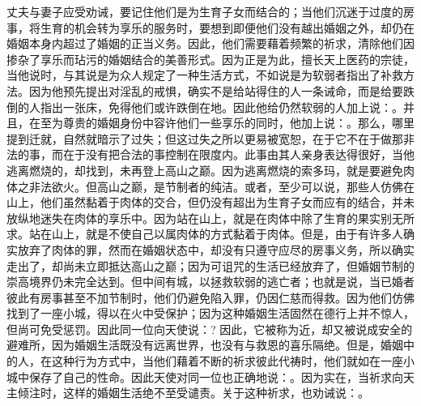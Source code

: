 丈夫与妻子应受劝诫，要记住他们是为生育子女而结合的；当他们沉迷于过度的房事，将生育的机会转为享乐的服务时，要想到即便他们没有越出婚姻之外，却仍在婚姻本身内超过了婚姻的正当义务。因此，他们需要藉着频繁的祈求，清除他们因掺杂了享乐而玷污的婚姻结合的美善形式。因为正是为此，擅长天上医药的宗徒，当他说时，与其说是为众人规定了一种生活方式，不如说是为软弱者指出了补救方法。因为他预先提出对淫乱的戒惧，确实不是给站得住的人一条诫命，而是给要跌倒的人指出一张床，免得他们或许跌倒在地。因此他给仍然软弱的人加上说：。并且，在至为尊贵的婚姻身份中容许他们一些享乐的同时，他加上说：。那么，哪里提到迁就，自然就暗示了过失；但这过失之所以更易被宽恕，在于它不在于做那非法的事，而在于没有把合法的事控制在限度内。此事由其人亲身表达得很好，当他逃离燃烧的，却找到，未再登上高山之巅。因为逃离燃烧的索多玛，就是要避免肉体之非法欲火。但高山之巅，是节制者的纯洁。或者，至少可以说，那些人仿佛在山上，他们虽然黏着于肉体的交合，但仍没有超出为生育子女而应有的结合，并未放纵地迷失在肉体的享乐中。因为站在山上，就是在肉体中除了生育的果实别无所求。站在山上，就是不使自己以属肉体的方式黏着于肉体。但是，由于有许多人确实放弃了肉体的罪，然而在婚姻状态中，却没有只遵守应尽的房事义务，所以确实走出了，却尚未立即抵达高山之巅；因为可诅咒的生活已经放弃了，但婚姻节制的崇高境界仍未完全达到。但中间有城，以拯救软弱的逃亡者；也就是说，当已婚者彼此有房事甚至不加节制时，他们仍避免陷入罪，仍因仁慈而得救。因为他们仿佛找到了一座小城，得以在火中受保护；因为这种婚姻生活固然在德行上并不惊人，但尚可免受惩罚。因此同一位向天使说：? 因此，它被称为近，却又被说成安全的避难所，因为婚姻生活既没有远离世界，也没有与救恩的喜乐隔绝。但是，婚姻中的人，在这种行为方式中，当他们藉着不断的祈求彼此代祷时，他们就如在一座小城中保存了自己的性命。因此天使对同一位也正确地说：。因为实在，当祈求向天主倾注时，这样的婚姻生活绝不至受谴责。关于这种祈求，也劝诫说：。\par

